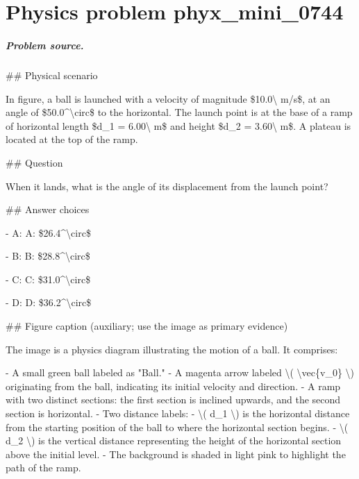 
\chapter{Physics problem phyx\_mini\_0744}
\label{ch:PhyXMiniProblems_problem_phyx_mini_0744}

\paragraph{Problem source.}
\#\# Physical scenario

In figure, a ball is launched with a velocity of magnitude \$10.0\textbackslash{} m/s\$, at an angle of \$50.0\textasciicircum{}\textbackslash{}circ\$ to the horizontal. The launch point is at the base of a ramp of horizontal length \$d\_1 = 6.00\textbackslash{} m\$ and height \$d\_2 = 3.60\textbackslash{} m\$. A plateau is located at the top of the ramp.

\#\# Question

When it lands, what is the angle of its displacement from the launch point?

\#\# Answer choices

- A: A: \$26.4\textasciicircum{}\textbackslash{}circ\$

- B: B: \$28.8\textasciicircum{}\textbackslash{}circ\$

- C: C: \$31.0\textasciicircum{}\textbackslash{}circ\$

- D: D: \$36.2\textasciicircum{}\textbackslash{}circ\$

\#\# Figure caption (auxiliary; use the image as primary evidence)

The image is a physics diagram illustrating the motion of a ball. It comprises:

- A small green ball labeled as "Ball."
- A magenta arrow labeled \textbackslash{}( \textbackslash{}vec\{v\_0\} \textbackslash{}) originating from the ball, indicating its initial velocity and direction.
- A ramp with two distinct sections: the first section is inclined upwards, and the second section is horizontal.
- Two distance labels:
  - \textbackslash{}( d\_1 \textbackslash{}) is the horizontal distance from the starting position of the ball to where the horizontal section begins.
  - \textbackslash{}( d\_2 \textbackslash{}) is the vertical distance representing the height of the horizontal section above the initial level.
- The background is shaded in light pink to highlight the path of the ramp.

